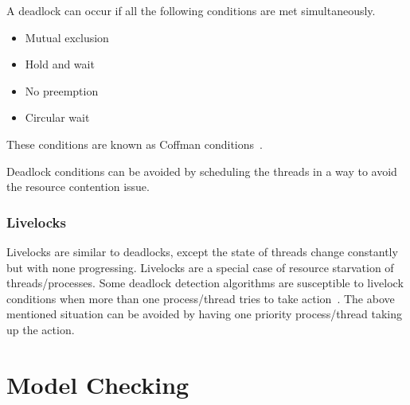 A deadlock can occur if all the following conditions are met simultaneously.

\begin{itemize}
\item	Mutual exclusion
\item	Hold and wait
\item	No preemption
\item	Circular wait
\end{itemize}

These conditions are known as Coffman conditions~\citep{coffman_cond}.

Deadlock conditions can be avoided by scheduling the threads in a way to avoid the resource contention issue.

\subsubsection{Livelocks}

Livelocks are similar to deadlocks, except the state of threads change constantly but with none progressing. 
Livelocks are a special case of resource starvation of threads/processes. 
Some deadlock detection algorithms are susceptible to livelock conditions when more than one process/thread tries to take action~\citep{lopez2017study}\citep{chaki2005concurrent}. 
The above mentioned situation can be avoided by having one priority process/thread taking up the action. 

\section{Model Checking \label{model_check}}

